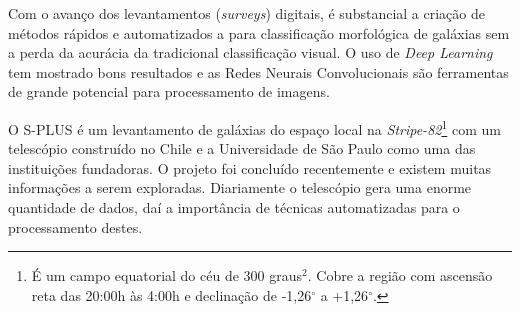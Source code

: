 Com o avanço dos levantamentos (\emph{surveys}) digitais, é substancial a criação de métodos rápidos e automatizados a para classificação morfológica de galáxias sem a perda da acurácia da tradicional classificação visual. \cite{yamauchi2005} O uso de \emph{Deep Learning} tem mostrado bons resultados e as Redes Neurais Convolucionais são ferramentas de grande potencial para processamento de imagens. \cite{barchi2020, dai2018}

O S-PLUS \cite{oliveira2019} é um levantamento de galáxias do espaço local na \emph{Stripe-82}\footnote{É um campo equatorial do céu de 300 graus$^{2}$. Cobre a região com ascensão reta das 20:00h às 4:00h e declinação de -1,26$^{\circ}$ a +1,26$^{\circ}$.} com um telescópio construído no Chile e a Universidade de São Paulo como uma das instituições fundadoras. O projeto foi concluído recentemente e existem muitas informações a serem exploradas. Diariamente o telescópio gera uma enorme quantidade de dados, daí a importância de técnicas automatizadas para o processamento destes.
